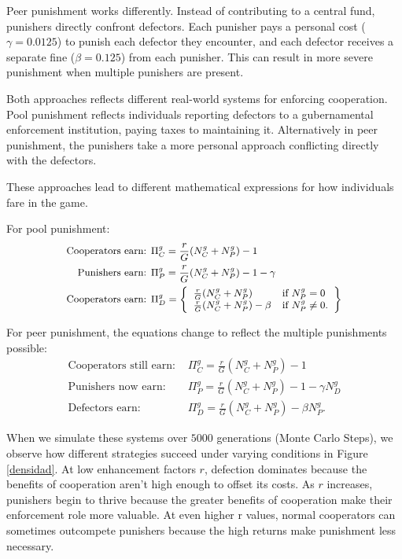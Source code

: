 Peer punishment works differently. Instead of contributing to a central fund, punishers directly confront defectors. Each punisher pays a personal cost ($\gamma=0.0125$) to punish each defector they encounter, and each defector receives a separate fine ($\beta=0.125$) from each punisher. This can result in more severe punishment when multiple punishers are present.

Both approaches reflects different real-world systems for enforcing cooperation. Pool punishment reflects individuals reporting defectors to a gubernamental enforcement institution, paying taxes to maintaining it. Alternatively in peer punishment, the punishers take a more personal approach conflicting directly with the defectors.


These approaches lead to different mathematical expressions for how individuals fare in the game.

For pool punishment:
\begin{equation}\small
\begin{split}
\text{Cooperators earn: } &\Pi_C^g=\frac{r}{G}(N_C^g+N_P^g)-1 \\
\text{Punishers earn: } &\Pi_P^g=\frac{r}{G}(N_C^g+N_P^g)-1-\gamma \\
\text{Cooperators earn: } &\Pi_D^g = \left\{ \begin{array}{ll}
\frac{r}{G}(N_C^g+N_P^g) & \mbox{if $N_P^g=0$} \\
\frac{r}{G}(N_C^g+N_P^g)-\beta & \mbox{if $N_P^g\neq0$}.
\end{array}
\right\}
\end{split}
\end{equation}


For peer punishment, the equations change to reflect the multiple punishments possible:
\begin{equation}
\begin{split}
\text{Cooperators still earn: } &\Pi_C^g=\frac{r}{G}(N_C^g+N_P^g)-1 \\
\text{Punishers now earn: } &\Pi_P^g=\frac{r}{G}(N_C^g+N_P^g)-1-\gamma N_D^g \\
\text{Defectors earn: } &\Pi_D^g=\frac{r}{G}(N_C^g+N_P^g)-\beta N_P^g.
\end{split}    
\end{equation}



When we simulate these systems over $5000$ generations (Monte Carlo Steps), we observe how different strategies succeed under varying conditions in Figure \ref{densidad}. At low enhancement factors $r$, defection dominates because the benefits of cooperation aren't high enough to offset its costs. As $r$ increases, punishers begin to thrive because the greater benefits of cooperation make their enforcement role more valuable. At even higher r values, normal cooperators can sometimes outcompete punishers because the high returns make punishment less necessary.

